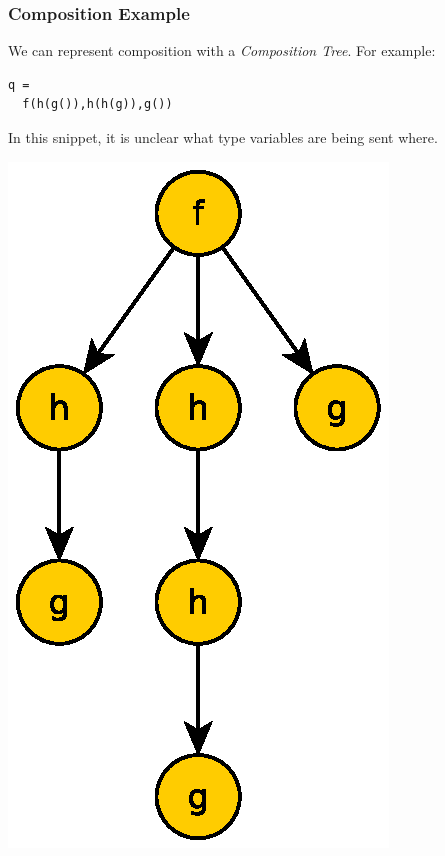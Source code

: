 \documentclass{beamer}
\begin{document}
\begin{frame}[fragile]
  \frametitle{Composition Example}

  \begin{multicols}{2}

    We can represent composition with a \emph{Composition Tree}. For
    example:
    

    \begin{lstlisting}[language=Paratype]
q = 
  f(h(g()),h(h(g)),g())
    \end{lstlisting}

    \vspace{2em}
    In this snippet, it is unclear what type variables are being sent
    where.

    \begin{center}
      \includegraphics[width=.75\linewidth]{media/composition.eps}    
    \end{center}
  \end{multicols}
\end{frame}
\end{document}
